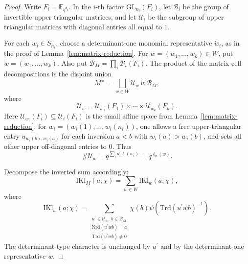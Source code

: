 \documentclass[11pt]{amsart}
\renewcommand{\subset}{\subseteq}
\newcommand{\IKl}{\mathrm{IKl}}
\newcommand{\Nrd}{\mathrm{Nrd}}
\newcommand{\Trd}{\mathrm{Trd}}
\numberwithin{equation}{section}
\theoremstyle{remark}
\theoremstyle{plain}
\theoremstyle{definition}
\begin{document}
\begin{proof}
Write \(F_i=\mathbb{F}_{q^{d_i}}\).  In the \(i\)-th factor
\(\mathrm{GL}_{n_i}(F_i)\), let \(\mathcal{B}_i\) be the group of
invertible upper triangular matrices, and let \(\mathcal{U}_i\) be the
subgroup of upper triangular matrices with diagonal entries all equal
to \(1\).

For each \(w_i\in S_{n_i}\), choose a determinant-one monomial
representative \(\dot w_i\), as in the proof of
Lemma~\ref{lem:matrix-reduction}.  For
\(w=(w_1,\ldots,w_k)\in W\), put
\(\dot w=(\dot w_1,\ldots,\dot w_k)\).  Also put
\(\mathcal{B}_M=\prod_i\mathcal{B}_i(F_i)\).  The product of the
matrix cell decompositions is the disjoint union
\[
M^\times
=
\bigsqcup_{w\in W}
\mathcal{U}_w\, \dot w\, \mathcal{B}_M,
\]
where
\[
\mathcal{U}_w=
\mathcal{U}_{w_1}(F_1)\times\cdots\times
\mathcal{U}_{w_k}(F_k).
\]
Here \(\mathcal{U}_{w_i}(F_i)\subset \mathcal{U}_i(F_i)\) is the
small affine space from Lemma~\ref{lem:matrix-reduction}: for
\(w_i=(w_i(1),\ldots,w_i(n_i))\), one allows a free upper-triangular
entry \(u_{w_i(b),w_i(a)}\) for each inversion \(a<b\) with
\(w_i(a)>w_i(b)\), and sets all other upper off-diagonal entries to
\(0\).  Thus
\[
\#\mathcal{U}_w=q^{\sum_i d_i\ell(w_i)}=q^{\ell_d(w)}.
\]

Decompose the inverted sum accordingly:
\begin{equation}\label{eq:ikl-cell-decomp}
\IKl_M(a;\chi)=\sum_{w\in W}\IKl_w(a;\chi),
\end{equation}
where
\[
\IKl_w(a;\chi)
=
\sum_{\substack{u^{\prime}\in \mathcal{U}_w,\, b\in \mathcal{B}_M\\
    \Nrd(u^{\prime}\dot w b)=a\\ \Trd(u^{\prime}\dot w b)\neq 0}}
\chi(b)\psi(\Trd(u^{\prime}\dot w b)^{-1}).
\]
The determinant-type character is unchanged by \(u^{\prime}\) and by the
determinant-one representative \(\dot w\).


\end{proof}
\end{document}
